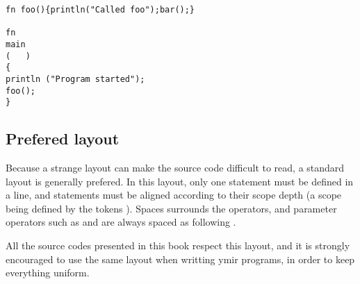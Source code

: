 \begin{lstlisting}[style=coloredverbatim, caption=Arbitrary code layout example]
fn foo(){println("Called foo");bar();}

fn
main
(   )
{
println ("Program started");
foo();
}
\end{lstlisting}

\subsection{Prefered layout}

Because a strange layout can make the source code difficult to read, a standard
layout is generally prefered. In this layout, only one statement must be defined
in a line, and statements must be aligned according to their scope depth (a
scope being defined by the tokens \token{\{\}}). Spaces surrounds the operators,
and parameter operators such as \token{()} and \token{[]} are always spaced as
following .

All the source codes presented in this book respect this layout, and it is
strongly encouraged to use the same layout when writting ymir programs, in order
to keep everything uniform.
